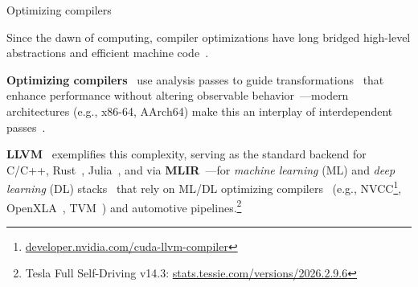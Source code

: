 \documentclass[
	aspectratio=169, %
]{beamer}
\newcommand{\mylink}[2]{\href{#1}{\textsf{#2}}}
\begin{document}
\begin{frame}[fragile]{Optimizing compilers}
	\begin{center}

	Since the dawn of computing, compiler optimizations have long bridged high-level abstractions and efficient machine code~\cite{Ershov58, Heller61, McKeeman65, Gear65, Lowry69, Busam69}.

	\textbf{Optimizing compilers}~\cite{Allen66, Wulf73b} use analysis passes to guide transformations~\cite{Cooper22, Kennedy01b, Paige97} that enhance performance without altering observable behavior~\cite{Bacon94, Dodds18, Aho06}---modern architectures (e.g., x86-64, AArch64) make this an interplay of interdependent passes~\cite{Cooper22}.

	\textbf{LLVM}~\cite{Lattner04} exemplifies this complexity, serving as the standard backend for C/C++, Rust~\cite{Matsakis14}, Julia~\cite{Bezanson12}, and via \textbf{MLIR}~\cite{Lattner21}---for \textit{machine learning} (ML) and \textit{deep learning} (DL) stacks~\cite{Paszke19, Abadi16} that rely on ML/DL optimizing compilers~\cite{Li20b, Xing19, Zhao18, Liu22d} (e.g., NVCC\footnote{
		\mylink{https://developer.nvidia.com/cuda-llvm-compiler}{developer.nvidia.com/cuda-llvm-compiler}
	}, OpenXLA~\cite{Sabne20}, TVM~\cite{Chen18c}) and automotive pipelines.\footnote{
		Tesla Full Self-Driving v14.3: \mylink{https://stats.tessie.com/versions/2026.2.9.6}{stats.tessie.com/versions/2026.2.9.6}
	}

	\end{center}




\end{frame}
\end{document}

